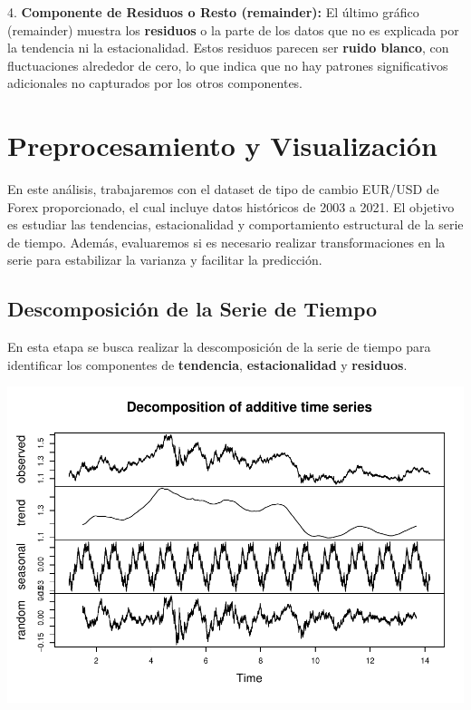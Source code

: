 \documentclass[
]{book}
\begin{document}
4. \textbf{Componente de Residuos o Resto (remainder):} El último gráfico (remainder) muestra los \textbf{residuos} o la parte de los datos que no es explicada por la tendencia ni la estacionalidad. Estos residuos parecen ser \textbf{ruido blanco}, con fluctuaciones alrededor de cero, lo que indica que no hay patrones significativos adicionales no capturados por los otros componentes.

\chapter{Preprocesamiento y Visualización}\label{preprocesamiento-y-visualizaciuxf3n}

En este análisis, trabajaremos con el dataset de tipo de cambio EUR/USD de Forex proporcionado, el cual incluye datos históricos de 2003 a 2021. El objetivo es estudiar las tendencias, estacionalidad y comportamiento estructural de la serie de tiempo. Además, evaluaremos si es necesario realizar transformaciones en la serie para estabilizar la varianza y facilitar la predicción.

\section{Descomposición de la Serie de Tiempo}\label{descomposiciuxf3n-de-la-serie-de-tiempo}

En esta etapa se busca realizar la descomposición de la serie de tiempo para identificar los componentes de \textbf{tendencia}, \textbf{estacionalidad} y \textbf{residuos}.

\includegraphics{bookdown_time_series_files/figure-latex/unnamed-chunk-8-1.pdf}
\end{document}
